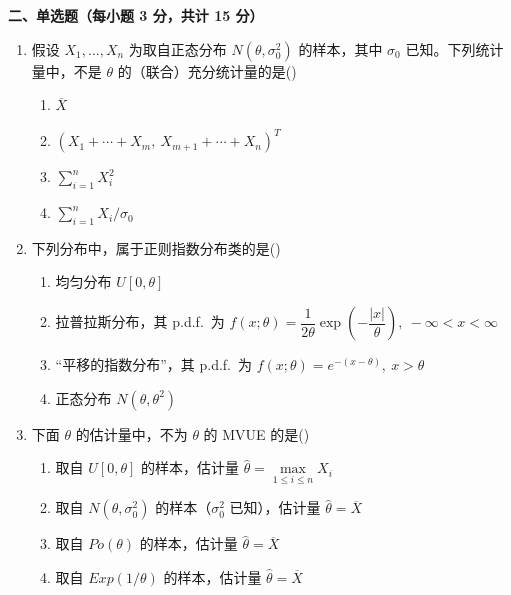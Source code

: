 \documentclass[12pt,a4paper]{ctexart}
\newcommand{\question}[1]{\bigskip\noindent\textbf{#1}\par\nobreak\medskip}
\begin{document}
\question{二、单选题（每小题 3 分，共计 15 分）}
\begin{enumerate}[label=\arabic*.,leftmargin=2.2em]
  \item 假设 $X_{1},\ldots,X_{n}$ 为取自正态分布 $N(\theta,\sigma_{0}^{2})$ 的样本，其中 $\sigma_{0}$ 已知。下列统计量中，不是 $\theta$ 的（联合）充分统计量的是\hfill(\underline{\hspace{1.2cm}})
  \begin{enumerate}[label=\Alph*.,leftmargin=2.0em]
    \item $\overline{X}$
    \item $\left(X_{1}+\cdots+X_{m},\ X_{m+1}+\cdots+X_{n}\right)^{T}$
    \item $\sum_{i=1}^{n}X_{i}^{2}$
    \item $\sum_{i=1}^{n}X_{i}/\sigma_{0}$
  \end{enumerate}

  \item 下列分布中，属于正则指数分布类的是\hfill(\underline{\hspace{1.2cm}})
  \begin{enumerate}[label=\Alph*.,leftmargin=2.0em]
    \item 均匀分布 $U[0,\theta]$
    \item 拉普拉斯分布，其 p.d.f.\ 为 $f(x;\theta)=\dfrac{1}{2\theta}\exp\!\left(-\dfrac{|x|}{\theta}\right),\ -\infty<x<\infty$
    \item “平移的指数分布”，其 p.d.f.\ 为 $f(x;\theta)=e^{-(x-\theta)},\ x>\theta$
    \item 正态分布 $N(\theta,\theta^{2})$
  \end{enumerate}

  \item 下面 $\theta$ 的估计量中，不为 $\theta$ 的 MVUE 的是\hfill(\underline{\hspace{1.2cm}})
  \begin{enumerate}[label=\Alph*.,leftmargin=2.0em]
    \item 取自 $U[0,\theta]$ 的样本，估计量 $\widehat{\theta}=\max\limits_{1\le i\le n}X_{i}$
    \item 取自 $N(\theta,\sigma_{0}^{2})$ 的样本（$\sigma_{0}^{2}$ 已知），估计量 $\widehat{\theta}=\overline{X}$
    \item 取自 $Po(\theta)$ 的样本，估计量 $\widehat{\theta}=\overline{X}$
    \item 取自 $Exp(1/\theta)$ 的样本，估计量 $\widehat{\theta}=\overline{X}$
  \end{enumerate}


\end{enumerate}
\end{document}
